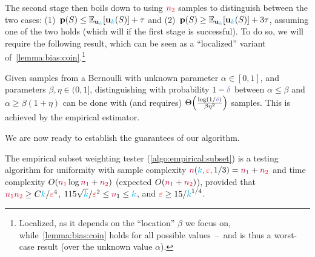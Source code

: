 The second stage then boils down to using $\textcolor{red}{{\textcolor{purple}{n}}_2}$ samples to distinguish between the two cases: (1)~$\p(S) \leq \bE{\uniform_\ab}{\uniform_\ab(S)} + \tau$ and (2)~$\p(S) \geq \bE{\uniform_\ab}{\uniform_\ab(S)} + 3\tau$, assuming one of the two holds (which will if the first stage is successful). To do so, we will require the following result, which can be seen as a ``localized'' variant of~\cref{lemma:bias:coin}.\footnote{Localized, as it depends on the ``location'' $\beta$ we focus on, while~\cref{lemma:bias:coin} holds for all possible values~--~and is thus a worst-case result (over the unknown value $\alpha$).}
\begin{fact}
  \label{lemma:bias:coin:test}
  Given \iid samples from a Bernoulli with unknown parameter $\alpha\in[0,1]$, and parameters $\beta,\eta\in(0,1]$, distinguishing with probability $1-\errprob$ between $\alpha \leq \beta$ and $\alpha \geq \beta(1+\eta)$ can be done with (and requires) $\bigTheta{\frac{\log(1/\errprob)}{\beta\eta^2}}$ samples. This is achieved by the empirical estimator. %
\end{fact} 
We are now ready to establish the guarantees of our algorithm.
\begin{theorem}
  \label{theo:empirical-subset}
The empirical subset weighting tester (\cref{algo:empirical:subset}) is a testing algorithm for uniformity with sample complexity ${\textcolor{purple}{n}}({\textcolor{cyan}{k}},\textcolor{red}{\varepsilon},1/3) = \textcolor{red}{{\textcolor{purple}{n}}_1}+\textcolor{red}{{\textcolor{purple}{n}}_2}$ and time complexity $O(\textcolor{red}{{\textcolor{purple}{n}}_1}\log\textcolor{red}{{\textcolor{purple}{n}}_1} + \textcolor{red}{{\textcolor{purple}{n}}_2})$ (expected $O(\textcolor{red}{{\textcolor{purple}{n}}_1}+\textcolor{red}{{\textcolor{purple}{n}}_2})$), provided that $\textcolor{red}{{\textcolor{purple}{n}}_1}\textcolor{red}{{\textcolor{purple}{n}}_2} \geq C{\textcolor{cyan}{k}}/\textcolor{red}{\varepsilon}^4$, $115\sqrt{{\textcolor{cyan}{k}}}/\textcolor{red}{\varepsilon}^2\leq {\textcolor{purple}{n}}_1 \leq {\textcolor{cyan}{k}}$, and $\textcolor{red}{\varepsilon} \geq 15/{\textcolor{cyan}{k}}^{1/4}$.
\end{theorem}
